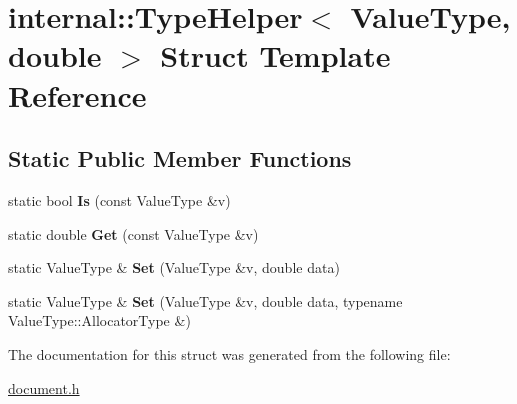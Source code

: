 \hypertarget{a02048}{}\section{internal\+:\+:Type\+Helper$<$ Value\+Type, double $>$ Struct Template Reference}
\label{a02048}
\subsection*{Static Public Member Functions}
\begin{DoxyCompactItemize}
\item 
\mbox{\label{a02048_a6c265a3202beb9bd85ecc7896a8ab9dd}} 
static bool {\bfseries Is} (const Value\+Type \&v)
\item 
\mbox{\label{a02048_ac55a96d2abd1dd6718a6cb3d6690aa38}} 
static double {\bfseries Get} (const Value\+Type \&v)
\item 
\mbox{\label{a02048_a2b332dd6083278283289e107caff879b}} 
static Value\+Type \& {\bfseries Set} (Value\+Type \&v, double data)
\item 
\mbox{\label{a02048_a69f7d942a569f3acdeb64127b2ecd9eb}} 
static Value\+Type \& {\bfseries Set} (Value\+Type \&v, double data, typename Value\+Type\+::\+Allocator\+Type \&)
\end{DoxyCompactItemize}


The documentation for this struct was generated from the following file\+:\begin{DoxyCompactItemize}
\item 
\hyperlink{a00476}{document.\+h}\end{DoxyCompactItemize}
